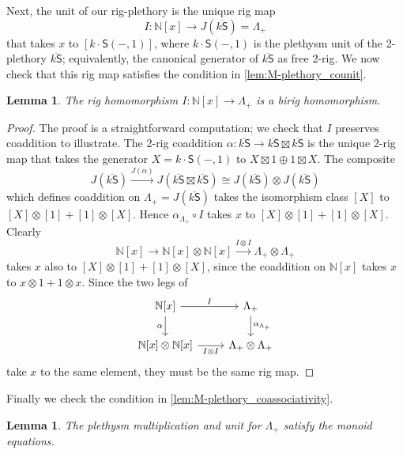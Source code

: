 \documentclass[12pt,reqno]{amsart}
\theoremstyle{plain}
\newtheorem{lem}[thm]{Lemma}
\theoremstyle{definition}
\theoremstyle{remark}
\newcommand{\maps}{\colon}
\newcommand{\category}[1]{\mathsf{#1}}
\newcommand{\N}{\mathbb N}
\renewcommand{\S}{\category S}
\newcommand{\ksbar}{\overline{k\S}}
\numberwithin{thm}{section}
\begin{document}
Next, the unit of our rig-plethory is the unique rig map 
\[
I \maps \N[x] \to J(\ksbar) = \Lambda_+
\]
that takes $x$ to $[k \cdot \S(-, 1)]$, where $k \cdot \S(-, 1)$ is the plethysm unit of the 2-plethory $\ksbar$; equivalently, the canonical generator of $\ksbar$ as free 2-rig. We now check that this rig map satisfies the condition in \cref{lem:M-plethory_counit}.

\begin{lem}
\label{prop:I-birig-map}
    The rig homomorphism $I \maps \N[x] \to \Lambda_+$ is a birig homomorphism. 
\end{lem} 

\begin{proof}
    The proof is a straightforward computation; we check that $I$ preserves coaddition to illustrate. The 2-rig coaddition $\alpha \maps \ksbar \to \ksbar \boxtimes \ksbar$ is the unique 2-rig map that takes the generator $X = k \cdot \S(-, 1)$ to $X \boxtimes 1 \oplus 1 \boxtimes X$. The composite 
    \[
    J(\ksbar) \stackrel{J(\alpha)}{\to} J(\ksbar \boxtimes \ksbar) \cong J(\ksbar) \otimes J(\ksbar)
    \]
    which defines coaddition on $\Lambda_+ = J(\ksbar)$ takes the isomorphism class $[X]$ to $[X]\otimes [1] + [1] \otimes [X]$. Hence $\alpha_{\Lambda_+} \circ I$ takes $x$ to $[X]\otimes [1] + [1] \otimes [X]$. Clearly 
    \[
    \N[x] \to \N[x] \otimes \N[x] \xrightarrow{I \otimes I} \Lambda_+ \otimes \Lambda_+ 
    \]
    takes $x$ also to $[X]\otimes [1] + [1] \otimes [X]$, since the coaddition on $\N[x]$ takes $x$ to $x \otimes 1 + 1 \otimes x$. Since the two legs of 
    \[
    \begin{tikzcd}
        \N[x] 
        \arrow[r, "I"] 
        \arrow[swap, d, "\alpha"] 
        & 
        \Lambda_+ 
        \arrow[d, "\alpha_{\Lambda_+}"] 
        \\
        \N[x] \otimes \N[x] 
        \arrow[r, "I \otimes I", swap] 
        & 
        \Lambda_+ \otimes \Lambda_+
    \end{tikzcd}
    \]
    take $x$ to the same element, they must be the same rig map. 
\end{proof}

Finally we check the condition in \cref{lem:M-plethory_coassociativity}.

\begin{lem}
\label{prop:monoid-equations}
    The plethysm multiplication and unit for $\Lambda_+$ satisfy the monoid equations. 
\end{lem}
\end{document}
